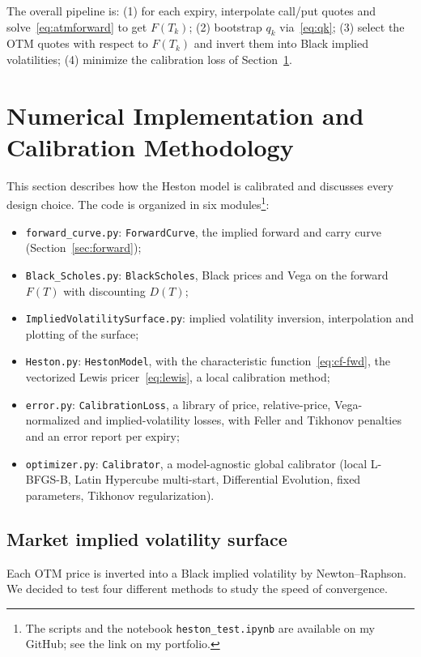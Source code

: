 \documentclass[11pt,a4paper]{article}
\theoremstyle{plain}
\theoremstyle{definition}
\begin{document}
The overall pipeline is: (1) for each expiry, interpolate call/put quotes and solve~\eqref{eq:atmforward} to get $F(T_k)$; (2) bootstrap $q_k$ via~\eqref{eq:qk}; (3) select the OTM quotes with respect to $F(T_k)$ and invert them into Black implied volatilities; (4) minimize the calibration loss of Section~\ref{sec:calibration}.






\clearpage
\section{Numerical Implementation and Calibration Methodology}
\label{sec:calibration}

This section describes how the Heston model is calibrated and discusses every design choice. The code is organized in six modules\footnote{The scripts and the notebook \texttt{heston\_test.ipynb} are available on my GitHub; see the link on my portfolio.}:
\begin{itemize}
    \item \texttt{forward\_curve.py}: \texttt{ForwardCurve}, the implied forward and carry curve (Section~\ref{sec:forward});
    \item \texttt{Black\_Scholes.py}: \texttt{BlackScholes}, Black prices and Vega on the forward $F(T)$ with discounting $D(T)$;
    \item \texttt{ImpliedVolatilitySurface.py}: implied volatility inversion, interpolation and plotting of the surface;
    \item \texttt{Heston.py}: \texttt{HestonModel}, with the characteristic function~\eqref{eq:cf-fwd}, the vectorized Lewis pricer~\eqref{eq:lewis}, a local calibration method;
    \item \texttt{error.py}: \texttt{CalibrationLoss}, a library of price, relative-price, Vega-normalized and implied-volatility losses, with Feller and Tikhonov penalties and an error report per expiry;
    \item \texttt{optimizer.py}: \texttt{Calibrator}, a model-agnostic global calibrator (local L-BFGS-B, Latin Hypercube multi-start, Differential Evolution, fixed parameters, Tikhonov regularization).
\end{itemize}

\subsection{Market implied volatility surface}
Each OTM price is inverted into a Black implied volatility by Newton--Raphson. We decided to test four different methods to study the speed of convergence. 
\end{document}
